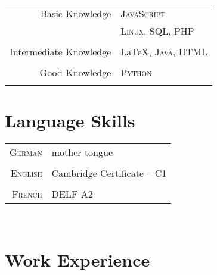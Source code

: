 \documentclass[a4paper,10pt]{article} %
\begin{document}
{\begin{minipage}[t]{0.44\textwidth}
\begin{tabular}{rl}
Basic Knowledge         & \textsc{JavaScript}\\
                        & \textsc{Linux}, \textsc{SQL}, \textsc{PHP}\\ \\
Intermediate Knowledge  & \LaTeX, \textsc{Java}, \textsc{HTML}\\ \\
Good Knowledge          & \textsc{Python}\\ \\
\end{tabular}


\section{Language Skills}

\begin{tabular}{rl}
\textsc{German}
& mother tongue\\
& \\
\textsc{English}
& Cambridge Certificate – C1\\
& \\
\textsc{French}
& DELF A2 \\
\end{tabular}\\[10pt]


\end{minipage} %

\begin{minipage}[t]{0.5\textwidth}
\vspace{0pt} %


\section{Work Experience}


\end{minipage}}
\end{document}
